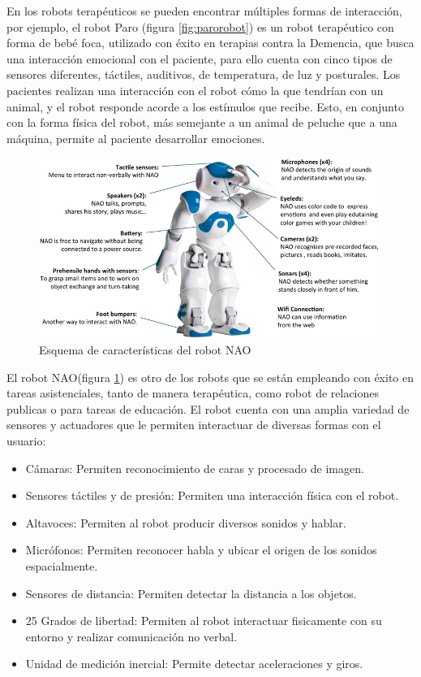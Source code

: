  En los robots terapéuticos se pueden encontrar múltiples formas de interacción, por ejemplo, el robot Paro\cite{parorobots} (figura \ref{fig:parorobot}) es un robot terapéutico con forma de bebé foca, utilizado con éxito en terapias contra la Demencia, que busca una interacción emocional con el paciente, para ello cuenta con cinco tipos de sensores diferentes, táctiles, auditivos, de temperatura, de luz y posturales. Los pacientes realizan una interacción con el robot cómo la que tendrían con un animal, y el robot responde acorde a los estímulos que recibe. Esto, en conjunto con la forma física del robot, más semejante a un animal de peluche que a una máquina, permite al paciente desarrollar emociones.
   \begin{figure}
	\centering
	\includegraphics[width=1\linewidth]{imagenes/naorobot.jpg}
	\caption{Esquema de características del robot NAO}
	\label{fig:naorobot}
\end{figure} 
 El robot NAO\cite{naorobots}(figura \ref{fig:naorobot}) es otro de los robots que se están empleando con éxito en tareas asistenciales, tanto de manera terapéutica, como robot de relaciones publicas o para tareas de educación. El robot cuenta con una amplia variedad de sensores y actuadores que le permiten interactuar de diversas formas con el usuario:
 \begin{itemize}
 	\item Cámaras: Permiten reconocimiento de caras y procesado de imagen.
 	\item Sensores táctiles y de presión: Permiten una interacción física con el robot.
 	\item Altavoces: Permiten al robot producir diversos sonidos y hablar.
 	\item Micrófonos: Permiten reconocer habla y ubicar el origen de los sonidos espacialmente.
 	\item Sensores de distancia: Permiten detectar la distancia a los objetos.
 	\item 25 Grados de libertad: Permiten al robot interactuar fisicamente con su entorno y realizar comunicación no verbal.
 	\item Unidad de medición inercial: Permite detectar aceleraciones y giros.
 \end{itemize}
